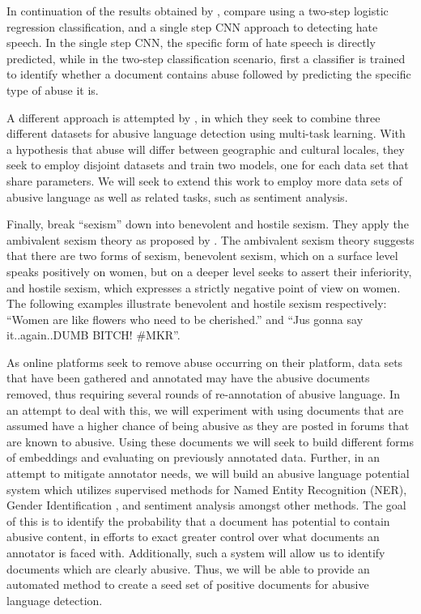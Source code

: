 In continuation of the results obtained by \cite{Badjatiya:2017}, \cite{Park:2017} compare using a two-step logistic regression classification, and a single step CNN approach to detecting hate speech. In the single step CNN, the specific form of hate speech is directly predicted, while in the two-step classification scenario, first a classifier is trained to identify whether a document contains abuse followed by predicting the specific type of abuse it is.

A different approach is attempted by \cite{Waseem:2018}, in which they seek to combine three different datasets for abusive language detection using multi-task learning. With a hypothesis that abuse will differ between geographic and cultural locales, they seek to employ disjoint datasets and train two models, one for each data set that share parameters. We will seek to extend this work to employ more data sets of abusive language as well as related tasks, such as sentiment analysis.

Finally, \cite{Jha:2017} break ``sexism'' down into benevolent and hostile sexism. They apply the ambivalent sexism theory as proposed by \cite{Glick:1996}. The ambivalent sexism theory suggests that there are two forms of sexism, benevolent sexism, which on a surface level speaks positively on women, but on a deeper level seeks to assert their inferiority, and hostile sexism, which expresses a strictly negative point of view on women. The following examples illustrate benevolent and hostile sexism respectively: ``Women are like flowers who need to be cherished.'' and ``Jus gonna say it..again..DUMB BITCH! \#MKR''.\vspace{5mm}

As online platforms seek to remove abuse occurring on their platform, data sets that have been gathered and annotated may have the abusive documents removed, thus requiring several rounds of re-annotation of abusive language. In an attempt to deal with this, we will experiment with using documents that are assumed have a higher chance of being abusive as they are posted in forums that are known to abusive. Using these documents we will seek to build different forms of embeddings and evaluating on previously annotated data. Further, in an attempt to mitigate annotator needs, we will build an abusive language potential system which utilizes supervised methods for Named Entity Recognition (NER), Gender Identification \citep{Sap:2014}, and sentiment analysis amongst other methods. The goal of this is to identify the probability that a document has potential to contain abusive content, in efforts to exact greater control over what documents an annotator is faced with. Additionally, such a system will allow us to identify documents which are clearly abusive. Thus, we will be able to provide an automated method to create a seed set of positive documents for abusive language detection.

